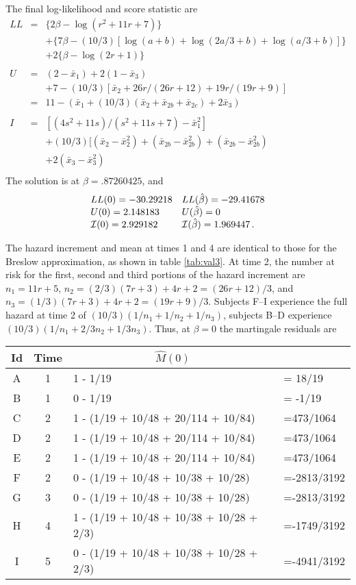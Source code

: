 \documentclass[11pt]{article}
\def\bhat{\hat \beta}        %
\def\Mhat{\widehat M}        %
\def\xbar{\bar x}
\def\imat{{\cal I}}
\begin{document}
The final log-likelihood and score statistic are
\begin{eqnarray*}
LL &=&  \{2\beta - \log(r^2 + 11r +7)\} \\ &&  + 
	\{7\beta - (10/3)[\log(a+b) + \log(2a/3 +b) + \log(a/3+b)] \} \\&& +
	 2\{\beta - \log(2r+1) \} \\ \\
U  &=& (2- \xbar_1) + 2(1-\xbar_3) \\
   && + 7 - (10/3)[\xbar_2 + 26r/(26r+12) + 19r/(19r+9)] \\
   &=& 11 -(\xbar_1 + (10/3)(\xbar_2 + \xbar_{2b} +\xbar_{2c}) 
		+ 2\xbar_3)\\ \\
I  &=& [(4s^2+11s)/(s^2+11s+7)- \xbar_1^2] \\ 
   &&+ (10/3)[ (\xbar_2- \xbar_2^2) + (\xbar_{2b}- \xbar_{2b}^2)
			+ (\xbar_{2b}- \xbar_{2b}^2) \\
   &&+2(\xbar_3 - \xbar_3^2) \\
\end{eqnarray*}
The solution is at $\beta=.87260425$, and 
$$
\begin{array}{ll}
 LL(0)=-30.29218 & LL(\bhat)=-29.41678 \\
 U(0) = 2.148183 & U(\bhat) = 0 \\
 \imat(0) = 2.929182 & \imat(\bhat) = 1.969447 \,.
\end{array}
$$

The hazard increment and mean at times 1 and 4 are identical to those
for the Breslow approximation, as shown in table \ref{tab:val3}.
At time 2, the number at risk for the first, second and third portions
of the hazard increment
are $n_1= 11r+5$, $n_2= (2/3)(7r+3) + 4r+2 = (26r+12)/3$, and
$n_3=(1/3)(7r+3) + 4r+2 = (19r+9)/3$.
Subjects F--I experience the full  hazard at time 2 
of $(10/3)(1/n_1 + 1/n_2 + 1/n_3)$,
subjects B--D experience $(10/3)(1/n_1 + 2/3n_2 + 1/3n_3)$.
Thus, at $\beta=0$ the martingale residuals are
\begin{center}
\begin{tabular}{cc|ll}
Id& Time & \multicolumn{1}{c}{$\Mhat(0)$} \\ \hline
A & 1 & 1 - 1/19 & = 18/19 \\
B & 1 & 0 - 1/19 & = -1/19 \\
C & 2 & 1 - (1/19 + 10/48 + 20/114 + 10/84)& =473/1064 \\
D & 2 & 1 - (1/19 + 10/48 + 20/114 + 10/84)& =473/1064 \\
E & 2 & 1 - (1/19 + 10/48 + 20/114 + 10/84) &=473/1064 \\
F & 2 & 0 - (1/19 + 10/48 + 10/38\phantom{4}  + 10/28)& =-2813/3192 \\
G & 3 & 0 - (1/19 + 10/48 + 10/38\phantom{4}  + 10/28) &=-2813/3192 \\
H & 4 & 1 - (1/19 + 10/48 + 10/38\phantom{4}  + 10/28 + 2/3) &=-1749/3192 \\
I & 5 & 0 - (1/19 + 10/48 + 10/38\phantom{4}  + 10/28 + 2/3) &=-4941/3192
\end{tabular}
\end{center}
\end{document}
